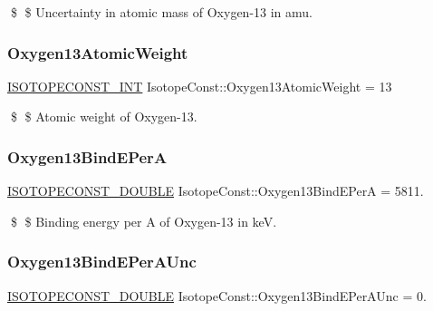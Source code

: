 \$ \$ Uncertainty in atomic mass of Oxygen-\/13 in amu. \mbox{\label{group___isotope_const-_oxygen-_o13_ga8b7ffc471ccc17c45e5ebc55e1cf78fb}} 
\subsubsection{\texorpdfstring{Oxygen13\+Atomic\+Weight}{Oxygen13AtomicWeight}}
{\footnotesize\ttfamily \mbox{\hyperlink{group___isotope_const-_macros_ga5f18360b3e99483a35c32d789e62621c}{I\+S\+O\+T\+O\+P\+E\+C\+O\+N\+S\+T\+\_\+\+I\+NT}} Isotope\+Const\+::\+Oxygen13\+Atomic\+Weight = 13}

\$ \$ Atomic weight of Oxygen-\/13. \mbox{\label{group___isotope_const-_oxygen-_o13_gac1cd55aae3069b83072a8ad60c9f71cd}} 
\subsubsection{\texorpdfstring{Oxygen13\+Bind\+E\+PerA}{Oxygen13BindEPerA}}
{\footnotesize\ttfamily \mbox{\hyperlink{group___isotope_const-_macros_ga8f45a7272ce02c0b4c65c44636ed719a}{I\+S\+O\+T\+O\+P\+E\+C\+O\+N\+S\+T\+\_\+\+D\+O\+U\+B\+LE}} Isotope\+Const\+::\+Oxygen13\+Bind\+E\+PerA = 5811.}

\$ \$ Binding energy per A of Oxygen-\/13 in keV. \mbox{\label{group___isotope_const-_oxygen-_o13_ga9aec64a7d6fb15c7dfd14f8e4bb85b31}} 
\subsubsection{\texorpdfstring{Oxygen13\+Bind\+E\+Per\+A\+Unc}{Oxygen13BindEPerAUnc}}
{\footnotesize\ttfamily \mbox{\hyperlink{group___isotope_const-_macros_ga8f45a7272ce02c0b4c65c44636ed719a}{I\+S\+O\+T\+O\+P\+E\+C\+O\+N\+S\+T\+\_\+\+D\+O\+U\+B\+LE}} Isotope\+Const\+::\+Oxygen13\+Bind\+E\+Per\+A\+Unc = 0.}

